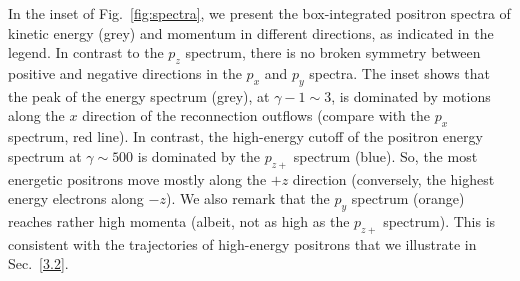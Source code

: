 \documentclass[twocolumn,twocolappendix]{aastex63}
\newcommand{\hz}{\textcolor{orange}}
\begin{document}
 In the inset of Fig.~\ref{fig:spectra}, we present the box-integrated positron spectra of kinetic energy (grey) and momentum in different directions, as indicated in the legend. In contrast to the $p_z$ spectrum, there is no broken symmetry between positive and negative directions in the $p_x$ and $p_y$ spectra.
 The inset shows that the peak of the energy spectrum (grey), at $\gamma-1\sim 3$, is dominated by motions along the $x$ direction of the reconnection outflows (compare with the $p_x$ spectrum, red line). In contrast, the high-energy cutoff of the positron energy spectrum at $\gamma\sim 500$ is dominated by the  $p_{z+}$ spectrum (blue). So, the most energetic positrons move mostly along the $+z$ direction (conversely, the highest energy electrons along $-z$). We also remark that the $p_y$ spectrum (orange) reaches rather high momenta (albeit, not as high as the $p_{z+}$ spectrum). This is consistent with the trajectories of high-energy positrons that we illustrate in Sec.~\ref{3.2}.
 


\end{document}
